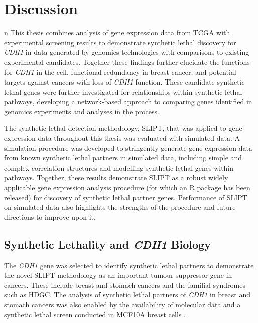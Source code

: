 \chapter{Discussion}
\label{chap:discussion}
n
This thesis combines analysis of \gls{gene expression} data from \gls{TCGA} with experimental screening results \citep{Telford2015} to demonstrate \gls{synthetic lethal} discovery for \textit{CDH1} in  data generated by \glspl{genomic} technologies with comparisons to existing experimental candidates. Together these findings further elucidate the functions for \textit{CDH1} in the cell, \gls{functional redundancy} in breast cancer, and potential targets against cancers with loss of \textit{CDH1} function. These candidate \gls{synthetic lethal} genes were further investigated for relationships within \gls{synthetic lethal} pathways, developing a network-based approach to comparing genes identified in \glspl{genomic} experiments and analyses in the process.

The \gls{synthetic lethal} detection methodology, \gls{SLIPT}, that was applied to \gls{gene expression} data throughout this thesis was evaluated with simulated data. A simulation procedure was developed to stringently generate \gls{gene expression} data from known \gls{synthetic lethal} partners in simulated data, including simple and complex correlation structures and modelling \gls{synthetic lethal} genes within pathways. Together, these results demonstrate \gls{SLIPT} as a robust widely applicable \gls{gene expression} analysis procedure (for which an R package has been released) for discovery of \gls{synthetic lethal} partner genes. Performance of \gls{SLIPT} on simulated data also highlights the strengths of the procedure and future directions to improve upon it.

\section{Synthetic Lethality and \textit{CDH1} Biology}
\label{chapt6:implications}

The \textit{CDH1} gene was selected to identify \gls{synthetic lethal} partners to demonstrate the novel \gls{SLIPT} methodology as an important \gls{tumour suppressor} gene in cancers. These include  breast and stomach cancers and the \gls{familial} syndromes such as \gls{HDGC}. The analysis of \gls{synthetic lethal} partners of \textit{CDH1} in breast and stomach cancers was also enabled by the availability of molecular data \citep{TCGA2012, TCGA2014GC} and a \gls{synthetic lethal} screen conducted in \gls{MCF10A} breast cells \citep{Chen2014, Telford2015}.

